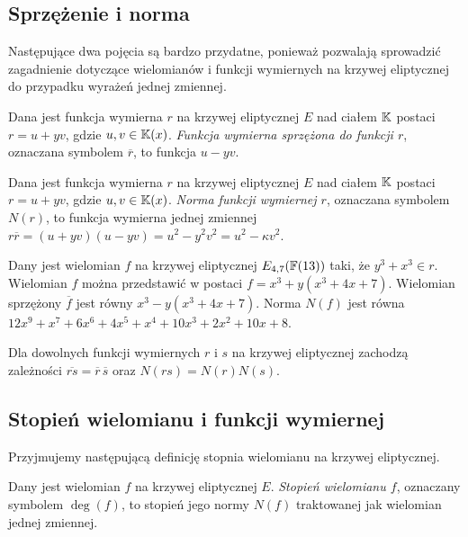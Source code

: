 \subsection*{Sprzężenie i norma}

\noindent
Następujące dwa pojęcia są bardzo przydatne,
ponieważ pozwalają sprowadzić
zagadnienie dotyczące wielomianów i funkcji wymiernych na krzywej eliptycznej
do przypadku wyrażeń jednej zmiennej.

\begin{definition}
Dana jest funkcja wymierna $r$ na krzywej eliptycznej $E$ nad ciałem $\mathbb{K}$
postaci $r = u + yv$, gdzie $u, v \in \mathbb{K}(x)$.
\emph{Funkcja wymierna sprzężona do funkcji $r$},
oznaczana symbolem $\overline{r}$,
to funkcja $u - yv$.
\end{definition}

\begin{definition}
Dana jest funkcja wymierna $r$ na krzywej eliptycznej $E$ nad ciałem $\mathbb{K}$
postaci $r = u + yv$, gdzie $u, v \in \mathbb{K}(x)$.
\emph{Norma funkcji wymiernej $r$},
oznaczana symbolem $N(r)$,
to funkcja wymierna jednej zmiennej
$r\overline{r} = (u + yv)(u - yv) = u^2 - y^2v^2 = u^2 - \kappa v^2$.
\end{definition}

\begin{example}\label{poly_conj_norm_ex}
Dany jest wielomian $f$ na krzywej eliptycznej $E_{4,7}(\mathbb{F}(13))$ taki,
że $y^3 + x^3 \in r$.
Wielomian $f$ można przedstawić w postaci $f = x^3 + y(x^3 + 4x + 7)$.
Wielomian sprzężony $\overline{f}$ jest równy $x^3 - y(x^3 + 4x + 7)$.
Norma $N(f)$ jest równa
$12x^9 + x^7 + 6x^6 + 4x^5 + x^4 + 10x^3 + 2x^2 + 10x + 8$.
\end{example}

\begin{fact}
Dla dowolnych funkcji wymiernych $r$ i $s$ na krzywej eliptycznej
zachodzą zależności
$\overline{rs} = \overline{r}\,\overline{s}$
oraz $N(rs) = N(r)N(s)$.
\end{fact}

\subsection*{Stopień wielomianu i funkcji wymiernej}

\noindent
Przyjmujemy następującą definicję stopnia wielomianu na krzywej eliptycznej.

\begin{definition}
Dany jest wielomian $f$ na krzywej eliptycznej $E$.
\emph{Stopień wielomianu $f$},
oznaczany symbolem $\deg(f)$,
to stopień jego normy $N(f)$ traktowanej jak wielomian jednej zmiennej.
\end{definition}

